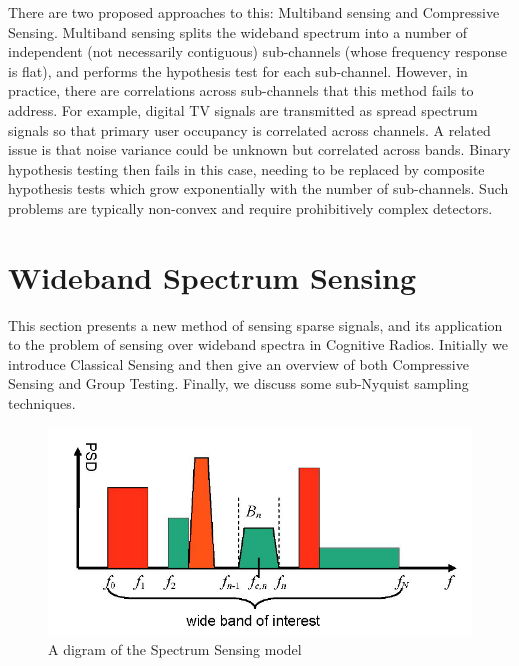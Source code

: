 \documentclass[12pt, a4paper]{article}
\begin{document}
There are two proposed approaches to this: Multiband sensing and Compressive Sensing. Multiband sensing splits the wideband spectrum into a number of independent (not necessarily contiguous) sub-channels (whose frequency response is flat), and performs the hypothesis test for each sub-channel. However, in practice, there are correlations across sub-channels that this method fails to address. For example, digital TV signals are transmitted as spread spectrum signals so that primary user occupancy is correlated across channels. A related issue is that noise variance could be unknown but correlated across bands. Binary hypothesis testing then fails in this case, needing to be replaced by composite hypothesis tests which grow exponentially with the number of sub-channels. Such problems are typically non-convex and require prohibitively complex detectors.

\section{Wideband Spectrum Sensing}
This section presents a new method of sensing sparse signals, and its application to the problem of sensing over wideband spectra in Cognitive Radios. Initially we introduce Classical Sensing and then give an overview of both Compressive Sensing and Group Testing. Finally, we discuss some sub-Nyquist sampling techniques.

\begin{figure}[h]
\centering
\includegraphics[height = 7 cm]{bands.png}
\caption{A digram of the Spectrum Sensing model \cite{Tian}}
\label{widebandspectra}
\end{figure}
\end{document}
